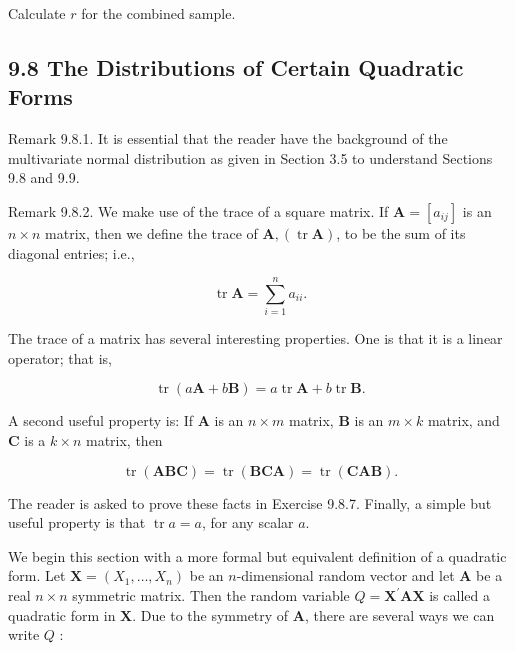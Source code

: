 Calculate $r$ for the combined sample.

\subsection*{9.8 The Distributions of Certain Quadratic Forms}
Remark 9.8.1. It is essential that the reader have the background of the multivariate normal distribution as given in Section 3.5 to understand Sections 9.8 and 9.9.

Remark 9.8.2. We make use of the trace of a square matrix. If $\mathbf{A}=\left[a_{i j}\right]$ is an $n \times n$ matrix, then we define the trace of $\mathbf{A},(\operatorname{tr} \mathbf{A})$, to be the sum of its diagonal entries; i.e.,


\begin{equation*}
\operatorname{tr} \mathbf{A}=\sum_{i=1}^{n} a_{i i} . \tag{9.8.1}
\end{equation*}


The trace of a matrix has several interesting properties. One is that it is a linear operator; that is,


\begin{equation*}
\operatorname{tr}(a \mathbf{A}+b \mathbf{B})=a \operatorname{tr} \mathbf{A}+b \operatorname{tr} \mathbf{B} . \tag{9.8.2}
\end{equation*}


A second useful property is: If $\mathbf{A}$ is an $n \times m$ matrix, $\mathbf{B}$ is an $m \times k$ matrix, and $\mathbf{C}$ is a $k \times n$ matrix, then


\begin{equation*}
\operatorname{tr}(\mathbf{A B C})=\operatorname{tr}(\mathbf{B C A})=\operatorname{tr}(\mathbf{C A B}) . \tag{9.8.3}
\end{equation*}


The reader is asked to prove these facts in Exercise 9.8.7. Finally, a simple but useful property is that $\operatorname{tr} a=a$, for any scalar $a$.

We begin this section with a more formal but equivalent definition of a quadratic form. Let $\mathbf{X}=\left(X_{1}, \ldots, X_{n}\right)$ be an $n$-dimensional random vector and let $\mathbf{A}$ be a real $n \times n$ symmetric matrix. Then the random variable $Q=\mathbf{X}^{\prime} \mathbf{A X}$ is called a\\
quadratic form in $\mathbf{X}$. Due to the symmetry of $\mathbf{A}$, there are several ways we can write $Q$ :


